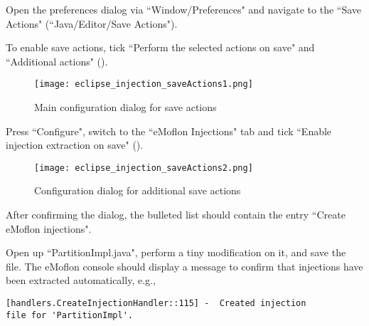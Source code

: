 \begin{stepbystep}

\item 
Open the preferences dialog via ``Window/Preferences" and navigate to the ``Save Actions" (``Java/Editor/Save Actions").

\item
To enable save actions, tick ``Perform the selected actions on save" and ``Additional actions" ().

\begin{figure}[htbp]
    \centering
    \texttt{[image: eclipse\_injection\_saveActions1.png]}
    \caption{Main configuration dialog for save actions}
    \label{eclipse:injection_saveActions1}
\end{figure}

\item
Press ``Configure", switch to the ``eMoflon Injections" tab and tick ``Enable injection extraction on save" ().

\begin{figure}[htbp]
    \centering
    \texttt{[image: eclipse\_injection\_saveActions2.png]}
    \caption{Configuration dialog for additional save actions}
    \label{eclipse:injection_saveActions2}
\end{figure}

\item
After confirming the dialog, the bulleted list should contain the entry ``Create eMoflon injections".

\item
Open up ``PartitionImpl.java", perform a tiny modification on it, and save the file.
The eMoflon console should display a message to confirm that injections have been extracted automatically, e.g.,
\begin{verbatim}
[handlers.CreateInjectionHandler::115] -  Created injection
file for 'PartitionImpl'.
\end{verbatim}

\end{stepbystep}

